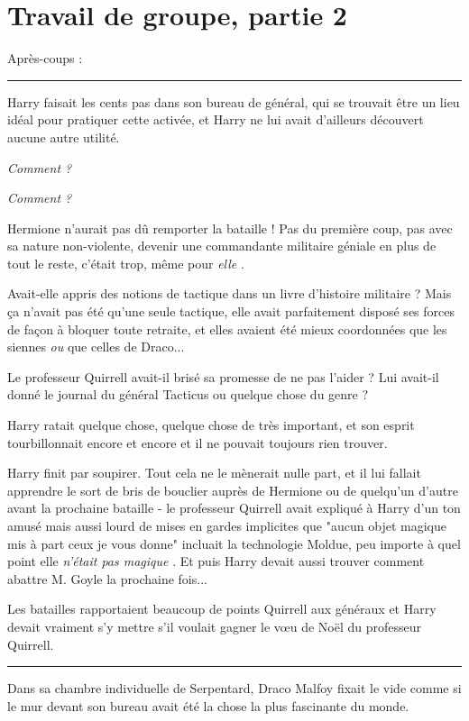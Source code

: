 
\chapter{Travail de groupe, partie 2}

Après-coups :
\par\noindent\rule{\textwidth}{0.4pt}
Harry faisait les cents pas dans son bureau de général, qui se trouvait être un lieu idéal pour pratiquer cette activée, et Harry ne lui avait d'ailleurs découvert aucune autre utilité.

\emph{Comment ?} 

\emph{Comment ?} 

Hermione n'aurait pas dû remporter la bataille ! Pas du première coup, pas avec sa nature non-violente, devenir une commandante militaire géniale en plus de tout le reste, c'était trop, même pour \emph{elle} .

Avait-elle appris des notions de tactique dans un livre d'histoire militaire ? Mais ça n'avait pas été qu'une seule tactique, elle avait parfaitement disposé ses forces de façon à bloquer toute retraite, et elles avaient été mieux coordonnées que les siennes \emph{ou}  que celles de Draco...

Le professeur Quirrell avait-il brisé sa promesse de ne pas l'aider ? Lui avait-il donné le journal du général Tacticus ou quelque chose du genre ?

Harry ratait quelque chose, quelque chose de très important, et son esprit tourbillonnait encore et encore et il ne pouvait toujours rien trouver.

Harry finit par soupirer. Tout cela ne le mènerait nulle part, et il lui fallait apprendre le sort de bris de bouclier auprès de Hermione ou de quelqu'un d'autre avant la prochaine bataille - le professeur Quirrell avait expliqué à Harry d'un ton amusé mais aussi lourd de mises en gardes implicites que "aucun objet magique mis à part ceux je vous donne" incluait la technologie Moldue, peu importe à quel point elle \emph{n'était pas magique} . Et puis Harry devait aussi trouver comment abattre M. Goyle la prochaine fois...

Les batailles rapportaient beaucoup de points Quirrell aux généraux et Harry devait vraiment s'y mettre s'il voulait gagner le vœu de Noël du professeur Quirrell.
\par\noindent\rule{\textwidth}{0.4pt}
Dans sa chambre individuelle de Serpentard, Draco Malfoy fixait le vide comme si le mur devant son bureau avait été la chose la plus fascinante du monde.

